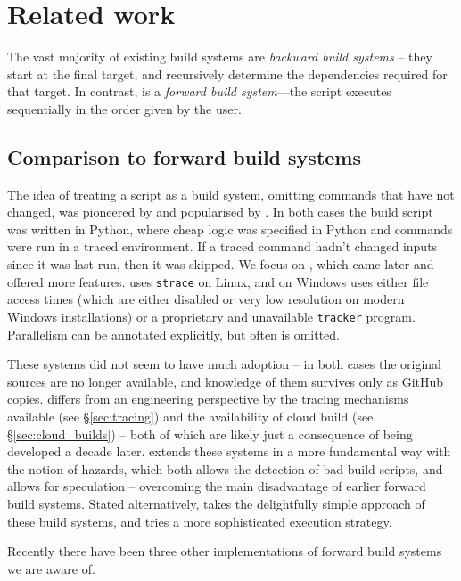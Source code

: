 \section{Related work}
\label{sec:related}

The vast majority of existing build systems are \emph{backward build systems} -- they start at the final target, and recursively determine the dependencies required for that target. In contrast, \Rattle is a \emph{forward build system}---the script executes sequentially in the order given by the user.

\subsection{Comparison to forward build systems}

The idea of treating a script as a build system, omitting commands that have not changed, was pioneered by \Memoize \cite{memoize} and popularised by \Fabricate \cite{fabricate}. In both cases the build script was written in Python, where cheap logic was specified in Python and commands were run in a traced environment. If a traced command hadn't changed inputs  since it was last run, then it was skipped. We focus on \Fabricate, which came later and offered more features. \Fabricate uses \texttt{strace} on Linux, and on Windows uses either file access times (which are either disabled or very low resolution on modern Windows installations) or a proprietary and unavailable \texttt{tracker} program. Parallelism can be annotated explicitly, but often is omitted.

These systems did not seem to have much adoption -- in both cases the original sources are no longer available, and knowledge of them survives only as GitHub copies. \Rattle differs from an engineering perspective by the tracing mechanisms available (see \S\ref{sec:tracing}) and the availability of cloud build (see \S\ref{sec:cloud_builds}) -- both of which are likely just a consequence of being developed a decade later. \Rattle extends these systems in a more fundamental way with the notion of hazards, which both allows the detection of bad build scripts, and allows for speculation -- overcoming the main disadvantage of earlier forward build systems. Stated alternatively, \Rattle takes the delightfully simple approach of these build systems, and tries a more sophisticated execution strategy.

Recently there have been three other implementations of forward build systems we are aware of.

